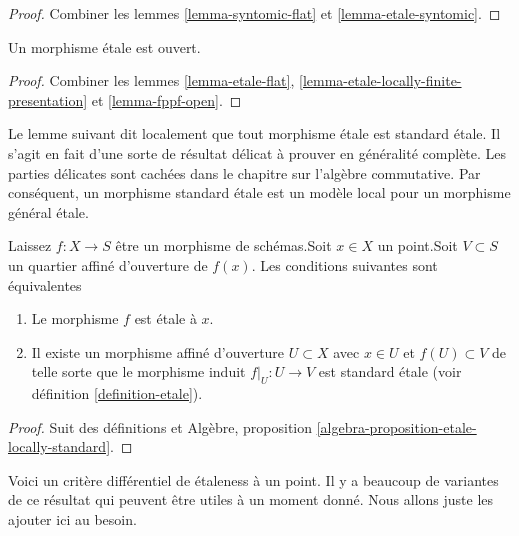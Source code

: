 \begin{proof}
Combiner les lemmes \ref{lemma-syntomic-flat} et \ref{lemma-etale-syntomic}.
\end{proof}

\begin{lemma}

\label{lemma-etale-open}
Un morphisme \'etale est ouvert.
\end{lemma}

\begin{proof}
Combiner les lemmes \ref{lemma-etale-flat}, \ref{lemma-etale-locally-finite-presentation} et \ref{lemma-fppf-open}.
\end{proof}

\noindent
Le lemme suivant dit localement que tout morphisme \'etale est standard \'etale. Il s'agit en fait d'une sorte de résultat délicat à prouver en généralité complète. Les parties délicates sont cachées dans le chapitre sur l'algèbre commutative. Par conséquent, un morphisme standard \'etale est un modèle local {\it} pour un morphisme général \'etale.

\begin{lemma}

\label{lemma-etale-locally-standard-etale}
Laissez $f : X  \to S$ être un morphisme de schémas.Soit $x \in X$ un point.Soit $V \subset S$ un quartier affiné d'ouverture de $f(x)$. Les conditions suivantes sont équivalentes
\begin{enumerate}
\item Le morphisme $f$ est \'etale à $x$.
\item Il existe un morphisme affiné d'ouverture $U \subset X$ avec $x \in U$ et $f(U) \subset V$ de telle sorte que le morphisme induit $f|_U : U \to V$ est standard \'etale (voir définition \ref{definition-etale}).
\end{enumerate}

\end{lemma}

\begin{proof}
Suit des définitions et Algèbre, proposition \ref{algebra-proposition-etale-locally-standard}.
\end{proof}

\noindent
Voici un critère différentiel de \'etaleness à un point. Il y a beaucoup de variantes de ce résultat qui peuvent être utiles à un moment donné. Nous allons juste les ajouter ici au besoin.

